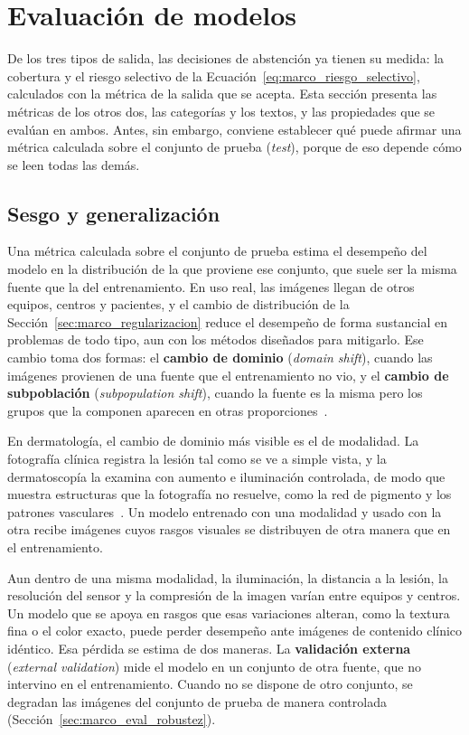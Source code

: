 \section{Evaluación de modelos}
\label{sec:marco_evaluacion}

De los tres tipos de salida, las decisiones de abstención ya tienen su medida: la cobertura y el riesgo selectivo
de la Ecuación~\ref{eq:marco_riesgo_selectivo}, calculados con la métrica de la salida que se acepta. Esta sección
presenta las métricas de los otros dos, las categorías y los textos, y las propiedades que se evalúan en ambos.
Antes, sin embargo, conviene establecer qué puede afirmar una métrica calculada sobre el conjunto de prueba
(\emph{test}), porque de eso depende cómo se leen todas las demás.

\subsection{Sesgo y generalización}
\label{sec:marco_generalizacion}

Una métrica calculada sobre el conjunto de prueba estima el desempeño del modelo en la distribución de la que proviene ese conjunto,
que suele ser la misma fuente que la del entrenamiento. En uso real, las imágenes llegan de otros equipos, centros y
pacientes, y el cambio de distribución de la Sección~\ref{sec:marco_regularizacion} reduce el desempeño de forma
sustancial en problemas de todo tipo, aun con los métodos diseñados para mitigarlo. Ese cambio toma dos formas: el
\textbf{cambio de dominio} (\emph{domain shift}), cuando las imágenes provienen de una fuente que el entrenamiento no vio, y el
\textbf{cambio de subpoblación} (\emph{subpopulation shift}), cuando la fuente es la misma pero los grupos que la componen aparecen en otras
proporciones~\cite{koh2021wilds}.

En dermatología, el cambio de dominio más visible es el de modalidad. La fotografía clínica registra la lesión tal
como se ve a simple vista, y la dermatoscopía la examina con aumento e iluminación controlada, de modo que muestra
estructuras que la fotografía no resuelve, como la red de pigmento y los patrones
vasculares~\cite{dinnes2018dermoscopy,kittler2016standardization}. Un modelo entrenado con una modalidad y usado
con la otra recibe imágenes cuyos rasgos visuales se distribuyen de otra manera que en el entrenamiento.

Aun dentro de una misma modalidad, la iluminación, la distancia a la lesión, la resolución del sensor y la
compresión de la imagen varían entre equipos y centros. Un modelo que se apoya en rasgos que esas variaciones
alteran, como la textura fina o el color exacto, puede perder desempeño ante imágenes de contenido clínico
idéntico. Esa pérdida se estima de dos maneras. La \textbf{validación externa} (\emph{external validation}) mide
el modelo en un conjunto de otra fuente, que no intervino en el entrenamiento. Cuando no se dispone de otro
conjunto, se degradan las imágenes del conjunto de prueba de manera controlada (Sección~\ref{sec:marco_eval_robustez}).

